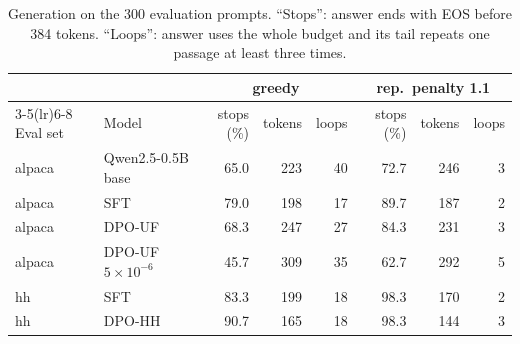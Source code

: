 \begin{table}[!ht]
\centering
\small
\begin{tabular}{llrrrrrr}
\toprule
& & \multicolumn{3}{c}{greedy} & \multicolumn{3}{c}{rep.\ penalty 1.1} \\
\cmidrule(lr){3-5}\cmidrule(lr){6-8}
Eval set & Model & stops (\%) & tokens & loops & stops (\%) & tokens & loops \\
\midrule
alpaca & Qwen2.5-0.5B base & 65.0 & 223 & 40 & 72.7 & 246 & 3 \\
alpaca & SFT & 79.0 & 198 & 17 & 89.7 & 187 & 2 \\
alpaca & DPO-UF & 68.3 & 247 & 27 & 84.3 & 231 & 3 \\
alpaca & DPO-UF $5{\times}10^{-6}$ & 45.7 & 309 & 35 & 62.7 & 292 & 5 \\
hh & SFT & 83.3 & 199 & 18 & 98.3 & 170 & 2 \\
hh & DPO-HH & 90.7 & 165 & 18 & 98.3 & 144 & 3 \\
\bottomrule
\end{tabular}
\caption{Generation on the 300 evaluation prompts. ``Stops'': answer ends with EOS before 384 tokens. ``Loops'':
answer uses the whole budget and its tail repeats one passage at least three times.}
\label{tab:generation}
\end{table}
